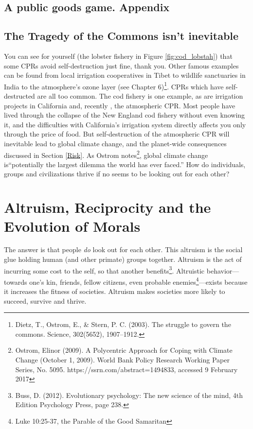 \documentclass[amstex,12pt]{book}
\begin{document}
\subsection{A public goods game. Appendix}
\subsection{The Tragedy of the Commons isn't inevitable}
You can see for yourself (the lobster fishery in Figure \ref{fig:cod_lobstah}) that some CPRs avoid self-destruction just fine, thank you. Other famous examples can be found from local irrigation cooperatives in Tibet to wildlife sanctuaries in India to the atmosphere's ozone layer (see Chapter 6)\footnote{Dietz, T., Ostrom, E., \& Stern, P. C. (2003). The struggle to govern the commons. Science, 302(5652), 1907–1912.}. CPRs which have self-destructed are all too common. The cod fishery is one example, as are irrigation projects in California and, recently , the atmospheric CPR. Most people have lived through the collapse of the New England cod fishery without even knowing it, and the difficulties with California's irrigation system directly affects you only through the price of food. But self-destruction of the atmospheric CPR will inevitable lead to global climate change, and the planet-wide consequences discussed in Section \ref{Risk}. As Ostrom notes\footnote{Ostrom, Elinor (2009). A Polycentric Approach for Coping with Climate Change (October 1, 2009). World Bank Policy Research Working Paper Series, No. 5095. https://ssrn.com/abstract=1494833, accessed 9 February 2017}, global climate change is``potentially the largest dilemma the world has ever faced.'' How do individuals, groups and civilizations thrive if no seems to be looking out for each other?\\ 

\section{Altruism, Reciprocity and the Evolution of Morals} \label{The Evolution of Morals}
The answer is that people \emph{do} look out for each other. This altruism is the social glue holding human (and other primate) groups together. Altruism is the act of incurring some cost to the self, so that another benefits\footnote{Buss, D. (2012). Evolutionary psychology: The new science of the mind, 4th Edition Psychology Press, page 238.}. Altruistic behavior---towards one's kin, friends, fellow citizens, even probable enemies\footnote{Luke 10:25-37, the Parable of the Good Samaritan}---exists because it increases the fitness of societies. Altruism makes societies more likely to succeed, survive and thrive. 
\end{document}
